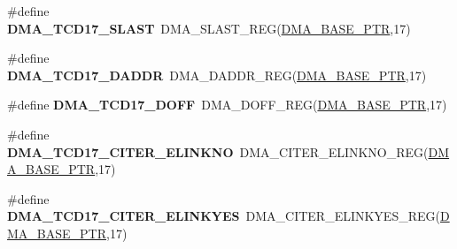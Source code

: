 \begin{DoxyCompactItemize}
\item 
\hypertarget{group___d_m_a___register___accessor___macros_ga0192277d9dfa3ebd6790c14adc7046d2}{}\#define {\bfseries D\+M\+A\+\_\+\+T\+C\+D17\+\_\+\+S\+L\+A\+S\+T}~D\+M\+A\+\_\+\+S\+L\+A\+S\+T\+\_\+\+R\+E\+G(\hyperlink{group___d_m_a___peripheral_ga6997fbc1b1973e9f27170217a3bd6f22}{D\+M\+A\+\_\+\+B\+A\+S\+E\+\_\+\+P\+T\+R},17)\label{group___d_m_a___register___accessor___macros_ga0192277d9dfa3ebd6790c14adc7046d2}

\item 
\hypertarget{group___d_m_a___register___accessor___macros_ga67f15a92f92ba9fccd7f5098d6bda4ae}{}\#define {\bfseries D\+M\+A\+\_\+\+T\+C\+D17\+\_\+\+D\+A\+D\+D\+R}~D\+M\+A\+\_\+\+D\+A\+D\+D\+R\+\_\+\+R\+E\+G(\hyperlink{group___d_m_a___peripheral_ga6997fbc1b1973e9f27170217a3bd6f22}{D\+M\+A\+\_\+\+B\+A\+S\+E\+\_\+\+P\+T\+R},17)\label{group___d_m_a___register___accessor___macros_ga67f15a92f92ba9fccd7f5098d6bda4ae}

\item 
\hypertarget{group___d_m_a___register___accessor___macros_ga0e816089c4d6e0145e8aedf035aae9c0}{}\#define {\bfseries D\+M\+A\+\_\+\+T\+C\+D17\+\_\+\+D\+O\+F\+F}~D\+M\+A\+\_\+\+D\+O\+F\+F\+\_\+\+R\+E\+G(\hyperlink{group___d_m_a___peripheral_ga6997fbc1b1973e9f27170217a3bd6f22}{D\+M\+A\+\_\+\+B\+A\+S\+E\+\_\+\+P\+T\+R},17)\label{group___d_m_a___register___accessor___macros_ga0e816089c4d6e0145e8aedf035aae9c0}

\item 
\hypertarget{group___d_m_a___register___accessor___macros_ga5e0f64f1ee131875cb0221bfc52198b4}{}\#define {\bfseries D\+M\+A\+\_\+\+T\+C\+D17\+\_\+\+C\+I\+T\+E\+R\+\_\+\+E\+L\+I\+N\+K\+N\+O}~D\+M\+A\+\_\+\+C\+I\+T\+E\+R\+\_\+\+E\+L\+I\+N\+K\+N\+O\+\_\+\+R\+E\+G(\hyperlink{group___d_m_a___peripheral_ga6997fbc1b1973e9f27170217a3bd6f22}{D\+M\+A\+\_\+\+B\+A\+S\+E\+\_\+\+P\+T\+R},17)\label{group___d_m_a___register___accessor___macros_ga5e0f64f1ee131875cb0221bfc52198b4}

\item 
\hypertarget{group___d_m_a___register___accessor___macros_gad3b5f49fce417f5a0ff8971ec7d8b423}{}\#define {\bfseries D\+M\+A\+\_\+\+T\+C\+D17\+\_\+\+C\+I\+T\+E\+R\+\_\+\+E\+L\+I\+N\+K\+Y\+E\+S}~D\+M\+A\+\_\+\+C\+I\+T\+E\+R\+\_\+\+E\+L\+I\+N\+K\+Y\+E\+S\+\_\+\+R\+E\+G(\hyperlink{group___d_m_a___peripheral_ga6997fbc1b1973e9f27170217a3bd6f22}{D\+M\+A\+\_\+\+B\+A\+S\+E\+\_\+\+P\+T\+R},17)\label{group___d_m_a___register___accessor___macros_gad3b5f49fce417f5a0ff8971ec7d8b423}


\end{DoxyCompactItemize}
